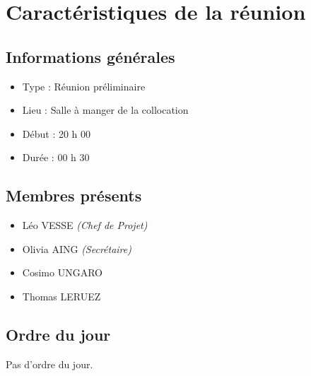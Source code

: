 \section{Caractéristiques de la réunion}
    \subsection{Informations générales}
        \begin{itemize}[label=\textbullet]
            \item Type : Réunion préliminaire
            \item Lieu : Salle à manger de la collocation  %
            \item Début : 20 h 00           %
            \item Durée : 00 h 30           %
        \end{itemize}

    \subsection{Membres présents}
        \begin{itemize}[label=\textbullet]
            \item Léo VESSE \textit{(Chef de Projet)} 
            \item Olivia AING \textit{(Secrétaire)}      %
            \item Cosimo UNGARO
            \item Thomas LERUEZ
        \end{itemize}

    \subsection{Ordre du jour}
        \begin{itemize}[label=\textbullet]
            Pas d'ordre du jour.
        \end{itemize}